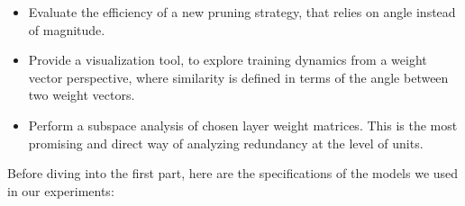 \begin{itemize}
\item Evaluate the efficiency of a new pruning strategy, that relies on angle instead of magnitude.
\item Provide a visualization tool, to explore training dynamics from a weight vector perspective, where similarity is defined in terms of the angle between two weight vectors.  
\item Perform a subspace analysis of chosen layer weight matrices. This is the most promising and direct way of analyzing redundancy at the level of units.
\end{itemize}

Before diving into the first part, here are the specifications of the models we used in our experiments:

